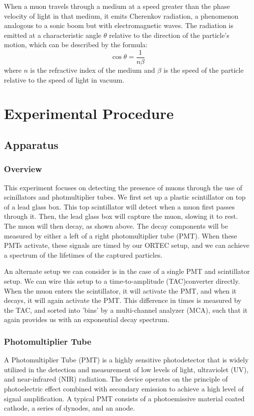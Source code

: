 \documentclass[10pt,letterpaper,onecolumn]{article}
\begin{document}
When a muon travels through a medium at a speed greater than the phase velocity of light in that medium, it emits Cherenkov radiation, a phenomenon analogous to a sonic boom but with electromagnetic waves. The radiation is emitted at a characteristic angle $\theta$ relative to the direction of the particle's motion, which can be described by the formula:
\[
\cos\theta = \frac{1}{n\beta}
\]
where $n$ is the refractive index of the medium and $\beta$ is the speed of the particle relative to the speed of light in vacuum. 
\cite{Jackson1999Electrodynamics}

\section{Experimental Procedure}
\subsection{Apparatus}
\subsubsection{Overview}
This experiment focuses on detecting the presence of muons through the use of scinillators and photmultiplier tubes. We first set up a plastic scintillator on top of a lead glass box. This top scintillator will detect when a muon first passes through it. Then, the lead glass box will capture the muon, slowing it to rest. The muon will then decay, as shown above. The decay components will be measured by either a left of a right photomultiplier tube (PMT). When these PMTs activate, these signals are timed by our ORTEC setup, and we can achieve a spectrum of the lifetimes of the captured particles. 

An alternate setup we can consider is in the case of a single PMT and scintillator setup. We can wire this setup to a time-to-amplitude (TAC)converter directly. When the muon enters the scintillator, it will activate the PMT, and when it decays, it will again activate the PMT. This difference in times is measured by the TAC, and sorted into 'bins' by a multi-channel analyzer (MCA), such that it again provides us with an exponential decay spectrum.
\subsubsection{Photomultiplier Tube}

A Photomultiplier Tube (PMT) is a highly sensitive photodetector that is widely utilized in the detection and measurement of low levels of light, ultraviolet (UV), and near-infrared (NIR) radiation. The device operates on the principle of photoelectric effect combined with secondary emission to achieve a high level of signal amplification. A typical PMT consists of a photoemissive material coated cathode, a series of dynodes, and an anode.
\end{document}
